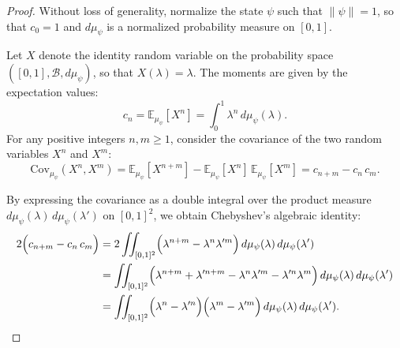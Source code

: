 \begin{proof}
Without loss of generality, normalize the state $\psi$ such that $\|\psi\| = 1$, so that $c_0 = 1$ and $d\mu_\psi$ is a normalized probability measure on $[0, 1]$. 

Let $X$ denote the identity random variable on the probability space $([0, 1], \mathcal{B}, d\mu_\psi)$, so that $X(\lambda) = \lambda$. The moments are given by the expectation values:
\begin{equation}
c_n = \mathbb{E}_{\mu_\psi}[X^n] = \int_0^1 \lambda^n \, d\mu_\psi(\lambda).
\end{equation}
For any positive integers $n, m \ge 1$, consider the covariance of the two random variables $X^n$ and $X^m$:
\begin{equation}
\label{eq:ch9_cov_def}
\mathrm{Cov}_{\mu_\psi}(X^n, X^m) = \mathbb{E}_{\mu_\psi}[X^{n+m}] - \mathbb{E}_{\mu_\psi}[X^n] \, \mathbb{E}_{\mu_\psi}[X^m] = c_{n+m} - c_n \, c_m.
\end{equation}

By expressing the covariance as a double integral over the product measure $d\mu_\psi(\lambda) \, d\mu_\psi(\lambda')$ on $[0, 1]^2$, we obtain Chebyshev's algebraic identity:
\begin{align}
\label{eq:ch9_chebyshev_algebraic}
2 \Bigl( c_{n+m} - c_n \, c_m \Bigr) &= 2 \iint_{[0, 1]^2} \Bigl( \lambda^{n+m} - \lambda^n \lambda'^m \Bigr) \, d\mu_\psi(\lambda) \, d\mu_\psi(\lambda') \nonumber \\
&= \iint_{[0, 1]^2} \Bigl( \lambda^{n+m} + \lambda'^{n+m} - \lambda^n \lambda'^m - \lambda'^n \lambda^m \Bigr) \, d\mu_\psi(\lambda) \, d\mu_\psi(\lambda') \nonumber \\
&= \iint_{[0, 1]^2} \Bigl( \lambda^n - \lambda'^n \Bigr) \Bigl( \lambda^m - \lambda'^m \Bigr) \, d\mu_\psi(\lambda) \, d\mu_\psi(\lambda').
\end{align}


\end{proof}
